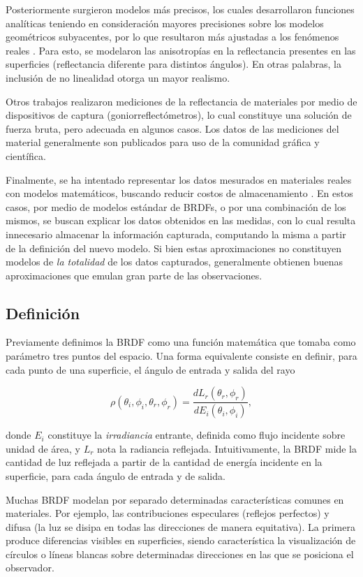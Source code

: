 Posteriormente surgieron modelos más precisos, los cuales desarrollaron funciones analíticas teniendo en consideración mayores precisiones sobre los modelos geométricos subyacentes, por lo que resultaron más ajustadas a los fenómenos reales \cite{He1991,Ward1992,Lafortune1997}.
Para esto, se modelaron las anisotropías en la reflectancia presentes en las superficies (reflectancia diferente para distintos ángulos).
En otras palabras, la inclusión de no linealidad otorga un mayor realismo.

Otros trabajos \cite{Dana1999,Matusik2003} realizaron mediciones de la reflectancia de materiales por medio de dispositivos de captura (goniorreflectómetros), lo cual constituye una solución de fuerza bruta, pero adecuada en algunos casos.
Los datos de las mediciones del material generalmente son publicados para uso de la comunidad gráfica y científica.

Finalmente, se ha intentado representar los datos mesurados en materiales reales con modelos matemáticos, buscando reducir costos de almacenamiento \cite{Ngan2005}.
En estos casos, por medio de modelos estándar de BRDFs, o por una combinación de los mismos, se buscan explicar los datos obtenidos en las medidas, con lo cual resulta innecesario almacenar la información capturada, computando la misma a partir de la definición del nuevo modelo.
Si bien estas aproximaciones no constituyen modelos de {\em la totalidad} de los datos capturados, generalmente obtienen buenas aproximaciones que emulan gran parte de las observaciones.

\subsection{Definición}
Previamente definimos la BRDF como una función matemática que tomaba como parámetro tres puntos del espacio.
Una forma equivalente consiste en definir, para cada punto de una superficie, el ángulo de entrada y salida del rayo

$$\rho(\theta_{i},\phi_{i},\theta_{r},\phi_{r}) = \frac{dL_{r}(\theta_{r},\phi_{r})}{dE_{i}(\theta_{i},\phi_{i})},$$

donde $E_{i}$ constituye la {\em irradiancia} entrante, definida como flujo incidente sobre unidad de área, y $L_{r}$ nota la radiancia reflejada.
Intuitivamente, la BRDF mide la cantidad de luz reflejada a partir de la cantidad de energía incidente en la superficie, para cada ángulo de entrada y de salida.

Muchas BRDF modelan por separado determinadas características comunes en materiales.
Por ejemplo, las contribuciones especulares (reflejos perfectos) y difusa (la luz se disipa en todas las direcciones de manera equitativa).
La primera produce diferencias visibles en superficies, siendo característica la visualización de círculos o líneas blancas sobre determinadas direcciones en las que se posiciona el observador.

